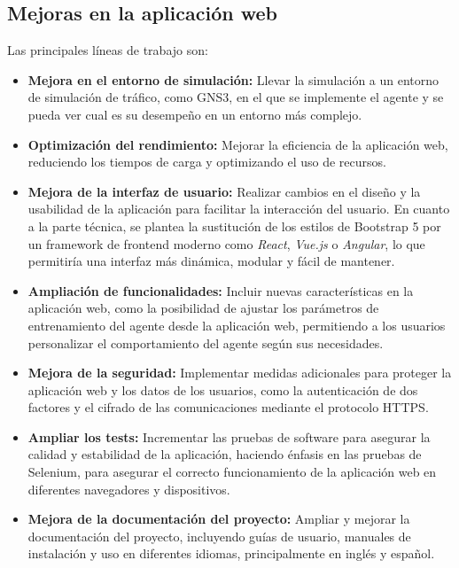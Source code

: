 \subsection{Mejoras en la aplicación web}
Las principales líneas de trabajo son:
\begin{itemize}
    \item \textbf{Mejora en el entorno de simulación:} Llevar la simulación a un entorno de simulación de tráfico, como GNS3, en el que se implemente el agente y se pueda ver cual es su desempeño en un entorno más complejo.
    \item \textbf{Optimización del rendimiento:} Mejorar la eficiencia de la aplicación web, reduciendo los tiempos de carga y optimizando el uso de recursos.
    \item \textbf{Mejora de la interfaz de usuario:} Realizar cambios en el diseño y la usabilidad de la aplicación para facilitar la interacción del usuario. En cuanto a la parte técnica, se plantea la sustitución de los estilos de Bootstrap 5 por un framework de frontend moderno como \textit{React}, \textit{Vue.js} o \textit{Angular}, lo que permitiría una interfaz más dinámica, modular y fácil de mantener.
    \item \textbf{Ampliación de funcionalidades:} Incluir nuevas características en la aplicación web, como la posibilidad de ajustar los parámetros de entrenamiento del agente desde la aplicación web, permitiendo a los usuarios personalizar el comportamiento del agente según sus necesidades.
    \item \textbf{Mejora de la seguridad:} Implementar medidas adicionales para proteger la aplicación web y los datos de los usuarios, como la autenticación de dos factores y el cifrado de las comunicaciones mediante el protocolo HTTPS.
    \item \textbf{Ampliar los tests:} Incrementar las pruebas de software para asegurar la calidad y estabilidad de la aplicación, haciendo énfasis en las pruebas de Selenium, para asegurar el correcto funcionamiento de la aplicación web en diferentes navegadores y dispositivos.
    \item \textbf{Mejora de la documentación del proyecto:} Ampliar y mejorar la documentación del proyecto, incluyendo guías de usuario, manuales de instalación y uso en diferentes idiomas, principalmente en inglés y español.
\end{itemize}
